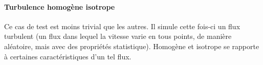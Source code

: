 \paragraph{Turbulence homogène isotrope}Ce cas de test est moins trivial que les autres. Il simule cette fois-ci un flux turbulent (un flux dans lequel la vitesse varie en tous points, de manière aléatoire, mais avec des propriétés statistique). Homogène et isotrope se rapporte à certaines caractéristiques d'un tel flux. 




